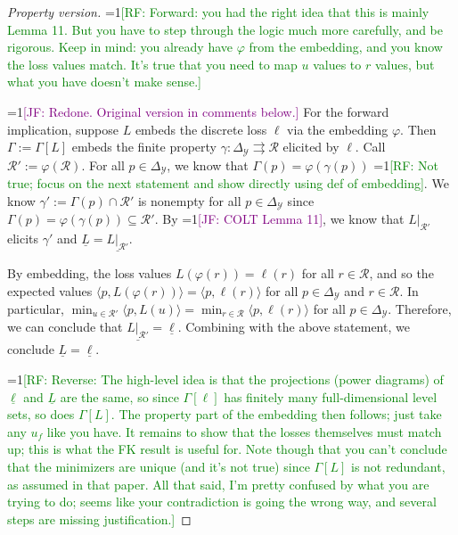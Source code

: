\documentclass[12pt]{article}
\newcommand{\Comments}{1}
\newcommand{\mynote}[2]{\ifnum\Comments=1\textcolor{#1}{#2}\fi}
\newcommand{\raf}[1]{\mynote{green}{[RF: #1]}}
\newcommand{\jessie}[1]{\mynote{purple}{[JF: #1]}}
\newcommand{\prop}[1]{\Gamma[#1]}
\newcommand{\simplex}{\Delta_\Y}
\newcommand{\R}{\mathcal{R}}
\newcommand{\Y}{\mathcal{Y}}
\newcommand{\risk}[1]{\underline{#1}}
\newcommand{\inprod}[2]{\langle #1, #2 \rangle}%
\newcommand{\toto}{\rightrightarrows}
\begin{document}
\begin{proof}[Property version]
  \raf{Forward: you had the right idea that this is mainly Lemma 11.  But you have to step through the logic much more carefully, and be rigorous.  Keep in mind: you already have $\varphi$ from the embedding, and you know the loss values match.  It's true that you need to map $u$ values to $r$ values, but what you have doesn't make sense.}
    
  \jessie{Redone.  Original version in comments below.}
  For the forward implication, suppose $L$ embeds the discrete loss $\ell$ via the embedding $\varphi$.
  Then $\Gamma := \prop{L}$ embeds the finite property $\gamma:\simplex \toto \R$ elicited by $\ell$.
  Call $\R' := \varphi(\R)$.
  For all $p \in \simplex$, we know that $\Gamma(p) = \varphi(\gamma(p))$ \raf{Not true; focus on the next statement and show directly using def of embedding}.
  We know $\gamma' := \Gamma(p) \cap \R'$ is nonempty for all $p \in \simplex$ since $\Gamma(p) = \varphi(\gamma(p)) \subseteq \R'$.
  By \jessie{COLT Lemma 11}, we know that $L|_{\R'}$ elicits $\gamma'$ and $\risk{L} = \risk{L|_{\R'}}$.
  
  By embedding, the loss values $L(\varphi(r)) = \ell(r)$ for all $r \in \R$, and so the expected values $\inprod{p}{L(\varphi(r))} = \inprod{p}{\ell(r)}$ for all $p \in \simplex$ and $r \in \R$.
  In particular, $\min_{u \in \R'}\inprod{p}{L(u)} = \min_{r \in \R}\inprod{p}{\ell(r)}$ for all $p \in \simplex$. 
  Therefore, we can conclude that $\risk{L|_{\R'}} = \risk{\ell}$.
  Combining with the above statement, we conclude $\risk{L} = \risk{\ell}$.


  
  \raf{Reverse: The high-level idea is that the projections (power diagrams) of $\risk{\ell}$ and $\risk{L}$ are the same, so since $\prop{\ell}$ has finitely many full-dimensional level sets, so does $\prop{L}$.  The property part of the embedding then follows; just take any $u_f$ like you have.  It remains to show that the losses themselves must match up; this is what the FK result is useful for.  Note though that you can't conclude that the minimizers are unique (and it's not true) since $\prop{L}$ is not redundant, as assumed in that paper.
    All that said, I'm pretty confused by what you are trying to do; seems like your contradiction is going the wrong way, and several steps are missing justification.}


\end{proof}
\end{document}
